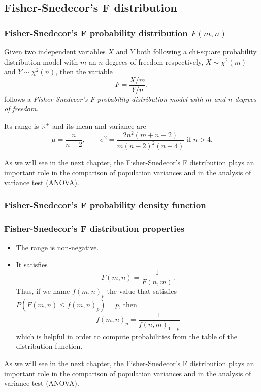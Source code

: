 \subsection{Fisher-Snedecor's F distribution}

\begin{frame}
\frametitle{Fisher-Snedecor's F probability distribution $F(m,n)$}
\begin{definition}
Given two independent variables $X$ and $Y$ both following a chi-square probability distribution model with $m$ an $n$
degrees of freedom respectively,  $X\sim \chi^2(m)$ and $Y\sim \chi^2(n)$, then the variable
\[
F = \frac{X/m}{Y/n},
\]
follows a \emph{Fisher-Snedecor's F probability distribution model with $m$ and $n$ degrees of freedom}.
\end{definition}

Its range is $\mathbb{R}^+$ and its mean and variance are
\[
\mu = \frac{n}{n-2}, \qquad \sigma^2 =\frac{2n^2(m+n−2)}{m(n-2)^2(n-4)}\mbox{ if $n>4$}.
\]

As we will see in the next chapter, the Fisher-Snedecor's F distribution plays an important role in the comparison of
population variances and in the analysis of variance test (ANOVA).
\end{frame}


\begin{frame}
\frametitle{Fisher-Snedecor's F probability density function}

\begin{center}
\end{center}
\end{frame}


\begin{frame}
\frametitle{Fisher-Snedecor's F distribution properties}
\begin{itemize}
\item The range is non-negative.
\item It satisfies
\[
F(m,n) =\frac{1}{F(n,m)}.
\]
Thus, if we name $f(m,n)_p$ the value that satisfies $P(F(m,n)\leq f(m,n)_p)=p$, then
\[
f(m,n)_p =\frac{1}{f(n,m)_{1-p}}
\]
which is helpful in order to compute probabilities from the table of the distribution function.
\end{itemize}

As we will see in the next chapter, the Fisher-Snedecor’s F distribution plays an important role in the comparison of population variances and in the analysis of variance test (ANOVA).
\end{frame}

